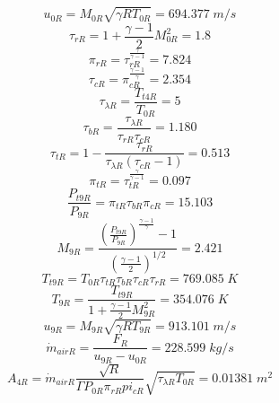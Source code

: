 \documentclass[conf]{new-aiaa}
\begin{document}
\begin{equation*}
    u_{0R} = M_{0R} \sqrt{\gamma R T_{0R}}
    =  694.377\;m/s
\end{equation*}
\begin{equation*}
    \tau_{rR} = 1+\frac{\gamma-1}{2} M_{0R}^2
    = 1.8
\end{equation*}
\begin{equation*}
    \pi_{rR} = \tau_{rR}^{\frac{\gamma}{\gamma-1}}
    = 7.824
\end{equation*}
\begin{equation*}
    \tau_{cR} = \pi_{cR}^{\frac{\gamma-1}{\gamma}}
    =  2.354
\end{equation*}
\begin{equation*}
    \tau_{\lambda R} = \frac{T_{t4R}}{T_{0R}}
    = 5 
\end{equation*}
\begin{equation*}
    \tau_{bR} = \frac{\tau_{\lambda R}}{\tau_{rR} \tau_{cR}}
    = 1.180 
\end{equation*}
\begin{equation*}
    \tau_{tR} = 1 - \frac{\tau_{rR}}{\tau_{\lambda R} \left(\tau_{cR}-1\right)}
    =  0.513
\end{equation*}
\begin{equation*}
    \pi_{tR} = \tau_{tR}^{\frac{\gamma}{\gamma-1}}
    =  0.097
\end{equation*}
\begin{equation*}
    \frac{P_{t9R}}{P_{9R}} = \pi_{tR} \tau_{bR} \pi_{cR}
    = 15.103 
\end{equation*}
\begin{equation*}
    M_{9R} = \frac{\left(\frac{P_{t9R}}{P_{9R}}\right)^{\frac{\gamma-1}{\gamma}} - 1}{\left(\frac{\gamma-1}{2}\right)^{1/2}}
    =  2.421
\end{equation*}
\begin{equation*}
    T_{t9R} = T_{0R} \tau_{tR} \tau_{bR} \tau_{cR} \tau_{rR}
    = 769.085\;K
\end{equation*}
\begin{equation*}
    T_{9R} = \frac{T_{t9R}}{1+\frac{\gamma-1}{2} M_{9R}^2}
    = 354.076\;K
\end{equation*}
\begin{equation*}
    u_{9R} = M_{9R} \sqrt{\gamma R T_{9R}}
    = 913.101\;m/s
\end{equation*}
\begin{equation*}
    \dot{m}_{air R} = \frac{F_{R}}{u_{9R} - u_{0R}}
    = 228.599\;kg/s
\end{equation*}
\begin{equation*}
    A_{4R} =  \dot{m}_{air R} \frac{\sqrt{R}}{\Gamma  P_{0R}\pi_{rR} pi_{cR}} \sqrt{\tau_{\lambda R} T_{0R}}
    = 0.01381\;m^2
\end{equation*}
\end{document}
